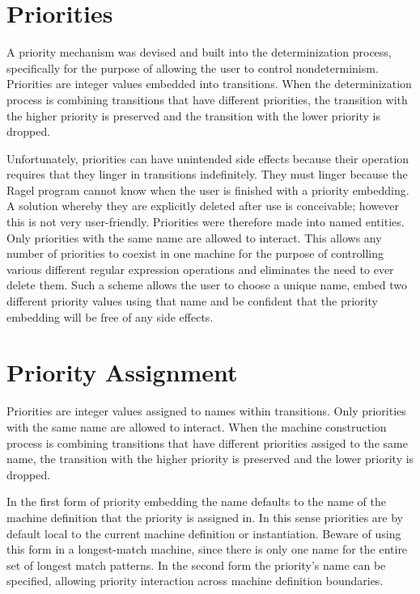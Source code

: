 \documentclass[letterpaper,11pt,oneside]{book}
\begin{document}
\section{Priorities}

A priority mechanism was devised and built into the determinization
process, specifically for the purpose of allowing the user to control
nondeterminism.  Priorities are integer values embedded into transitions. When
the determinization process is combining transitions that have different
priorities, the transition with the higher priority is preserved and the
transition with the lower priority is dropped.

Unfortunately, priorities can have unintended side effects because their
operation requires that they linger in transitions indefinitely. They must linger
because the Ragel program cannot know when the user is finished with a priority
embedding.  A solution whereby they are explicitly deleted after use is
conceivable; however this is not very user-friendly.  Priorities were therefore
made into named entities. Only priorities with the same name are allowed to
interact.  This allows any number of priorities to coexist in one machine for
the purpose of controlling various different regular expression operations and
eliminates the need to ever delete them. Such a scheme allows the user to
choose a unique name, embed two different priority values using that name
and be confident that the priority embedding will be free of any side effects.

\section{Priority Assignment}

Priorities are integer values assigned to names within transitions.
Only priorities with the same name are allowed to interact. When the machine
construction process is combining transitions that have different priorities
assiged to the same name, the transition with the higher priority is preserved
and the lower priority is dropped.

In the first form of priority embedding the name defaults to the name of the machine
definition that the priority is assigned in. In this sense priorities are by
default local to the current machine definition or instantiation. Beware of
using this form in a longest-match machine, since there is only one name for
the entire set of longest match patterns. In the second form the priority's
name can be specified, allowing priority interaction across machine definition
boundaries.
\end{document}
